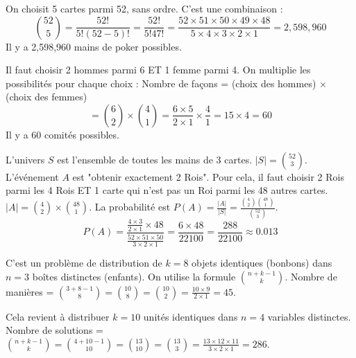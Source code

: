 \begin{correctionbox}
On choisit 5 cartes parmi 52, sans ordre. C'est une combinaison :
$$ \binom{52}{5} = \frac{52!}{5!(52-5)!} = \frac{52!}{5!47!} = \frac{52 \times 51 \times 50 \times 49 \times 48}{5 \times 4 \times 3 \times 2 \times 1} = 2,598,960 $$
Il y a 2,598,960 mains de poker possibles.
\end{correctionbox}

\begin{correctionbox}
Il faut choisir 2 hommes parmi 6 ET 1 femme parmi 4. On multiplie les possibilités pour chaque choix :
Nombre de façons = (choix des hommes) $\times$ (choix des femmes)
$$ = \binom{6}{2} \times \binom{4}{1} = \frac{6 \times 5}{2 \times 1} \times \frac{4}{1} = 15 \times 4 = 60 $$
Il y a 60 comités possibles.
\end{correctionbox}

\begin{correctionbox}
L'univers $S$ est l'ensemble de toutes les mains de 3 cartes. $|S| = \binom{52}{3}$.
L'événement $A$ est "obtenir exactement 2 Rois". Pour cela, il faut choisir 2 Rois parmi les 4 Rois ET 1 carte qui n'est pas un Roi parmi les 48 autres cartes.
$|A| = \binom{4}{2} \times \binom{48}{1}$.
La probabilité est $P(A) = \frac{|A|}{|S|} = \frac{\binom{4}{2} \binom{48}{1}}{\binom{52}{3}}$.
$$ P(A) = \frac{\frac{4 \times 3}{2 \times 1} \times 48}{\frac{52 \times 51 \times 50}{3 \times 2 \times 1}} = \frac{6 \times 48}{22100} = \frac{288}{22100} \approx 0.013 $$
\end{correctionbox}


\begin{correctionbox}
C'est un problème de distribution de $k=8$ objets identiques (bonbons) dans $n=3$ boîtes distinctes (enfants). On utilise la formule $\binom{n+k-1}{k}$.
Nombre de manières = $\binom{3+8-1}{8} = \binom{10}{8} = \binom{10}{2} = \frac{10 \times 9}{2 \times 1} = 45$.
\end{correctionbox}

\begin{correctionbox}
Cela revient à distribuer $k=10$ unités identiques dans $n=4$ variables distinctes.
Nombre de solutions = $\binom{n+k-1}{k} = \binom{4+10-1}{10} = \binom{13}{10} = \binom{13}{3} = \frac{13 \times 12 \times 11}{3 \times 2 \times 1} = 286$.
\end{correctionbox}

